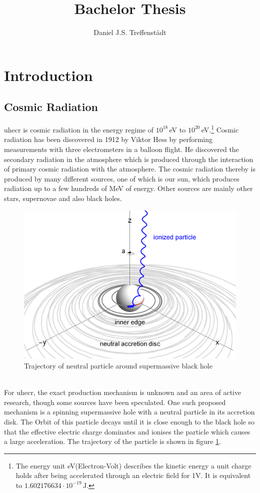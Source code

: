 \documentclass[abstract,toc,los,english,11pt,glossaries]{jluthesis}
\title[Bachelor Thesis]{Bachelor Thesis}
\author[Daniel Treffenstädt]{Daniel J.S. Treffenstädt}
\begin{document}

\section{Introduction}
\subsection{Cosmic Radiation}
\acrfull{uhecr} is cosmic radiation in the energy regime of $10^{18}$\,eV to $10^{20}$\,eV.\footnote{The energy unit eV(Electron-Volt) describes the kinetic energy a unit charge holds after being accelerated through an electric field for 1V. It is equivalent to $1.602176634\cdot10^{-19}\,\text{J}$.}
Cosmic radiation has been discovered in 1912 by Viktor Hess by performing measurements with three electrometers in a balloon flight. He discovered the secondary radiation in the atmosphere which is produced through the interaction of primary cosmic radiation with the atmosphere. The cosmic radiation thereby is produced by many different sources, one of which is our sun, which produces radiation up to a few hundreds of MeV of energy. Other sources are mainly other stars, supernovae and also black holes. \\
\begin{figure}[ht!]
	\centering
	\includegraphics[width=0.5\linewidth]{data/uhecr-sm-bh}
	\caption{Trajectory of neutral particle around supermassive black hole \cite{Tursunov_2020}}
	\label{fig:uhecr-sm-bh}
\end{figure}\\
For \acrshort{uhecr}, the exact production mechanism is unknown and an area of active research, though some sources have been speculated. One such proposed mechanism is a spinning supermassive hole with a neutral particle in its accretion disk. The Orbit of this particle decays until it is close enough to the black hole so that the effective electric charge dominates and ionises the particle which causes a large acceleration\cite{Tursunov_2020}. The trajectory of the particle is shown in figure \ref{fig:uhecr-sm-bh}.\\
\end{document}
